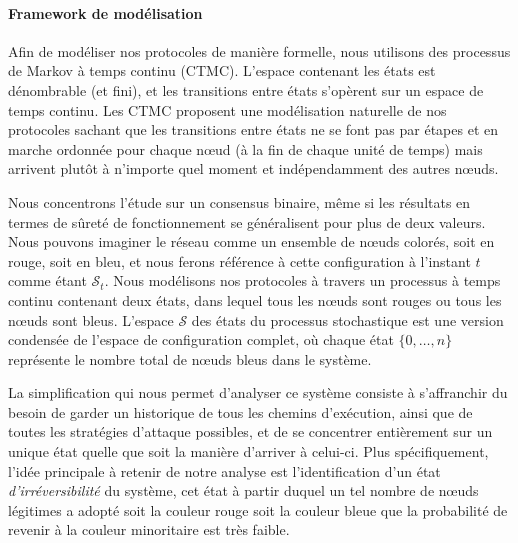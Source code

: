 \documentclass[a4,twocolumn,10pt]{article}
\DeclarePairedDelimiter{\floor}{\lfloor}{\rfloor}
\theoremstyle{definition}
\begin{document}

\paragraph{Framework de modélisation} Afin de modéliser nos protocoles de manière formelle, nous utilisons des
processus de Markov à temps continu (CTMC). L'espace contenant les états est dénombrable (et fini), et les transitions
entre états s'opèrent sur un espace de temps continu. Les CTMC proposent une modélisation naturelle de nos protocoles
sachant que les transitions entre états ne se font pas par étapes et en marche ordonnée pour chaque nœud (à la fin de
chaque unité de temps) mais arrivent plutôt à n'importe quel moment et indépendamment des autres nœuds.

Nous concentrons l'étude sur un consensus binaire, même si les résultats en termes de sûreté de fonctionnement se
généralisent pour plus de deux valeurs. Nous pouvons imaginer le réseau comme un ensemble de nœuds colorés, soit en
rouge, soit en bleu, et nous ferons référence à cette configuration à l'instant $t$ comme étant $\mathcal{S}_t$.
Nous modélisons nos protocoles à travers un processus à temps continu contenant deux états, dans lequel tous les nœuds
sont rouges ou tous les nœuds sont bleus. L'espace $\mathcal{S}$ des états du processus stochastique est une version
condensée de l'espace de configuration complet, où chaque état $\{0, \dots, n\}$ représente le nombre total de nœuds
bleus dans le système.

La simplification qui nous permet d'analyser ce système consiste à s'affranchir du besoin de garder un historique de
tous les chemins d'exécution, ainsi que de toutes les stratégies d'attaque possibles, et de se concentrer 
entièrement sur un unique état quelle que soit la manière d'arriver à celui-ci. Plus spécifiquement, l'idée principale
à retenir de notre analyse est l'identification d'un état \textit{d'irréversibilité} du système, cet état à partir
duquel un tel nombre de nœuds légitimes a adopté soit la couleur rouge soit la couleur bleue que la probabilité de
revenir à la couleur minoritaire est très faible.
\end{document}
